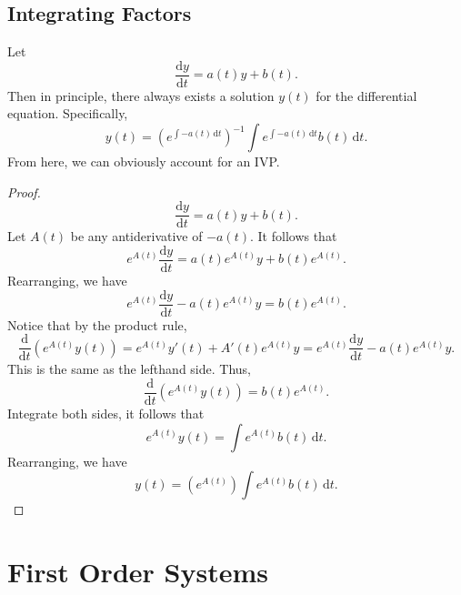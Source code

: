 \section{Integrating Factors}
\begin{theorem}\label{thm:7}
	Let
	\[
		\frac{\mathrm{d}y}{\mathrm{d}t} =a(t)y+b(t)
	.\]
	Then in principle, there always exists a solution $y(t)$ for the differential equation. Specifically,
	\[
		y(t)=\left( e^{\int -a(t) \,\mathrm{d} t} \right) ^{-1}\int e^{\int -a(t) \,\mathrm{d} t}b(t) \,\mathrm{d} t
	.\]
	From here, we can obviously account for an IVP.
\end{theorem}
\begin{proof}
\[
	\frac{\mathrm{d}y}{\mathrm{d}t} =a(t)y+b(t)
.\]
Let $A(t)$ be any antiderivative of $-a(t)$. It follows that
\[
	e^{A(t)}\frac{\mathrm{d}y}{\mathrm{d}t} =a(t)e^{A(t)}y+b(t)e^{A(t)}
.\]
Rearranging, we have
\[
	e^{A(t)}\frac{\mathrm{d}y}{\mathrm{d}t} -a(t)e^{A(t)}y=b(t)e^{A(t)}
.\]
Notice that by the product rule,
\[
	\frac{\mathrm{d}}{\mathrm{d}t} \left( e^{A(t)}y(t) \right) =e^{A(t)}y'(t)+A'(t)e^{A(t)}y=e^{A(t)}\frac{\mathrm{d}y}{\mathrm{d}t} -a(t)e^{A(t)}y
.\]
This is the same as the lefthand side. Thus,
\[
	\frac{\mathrm{d}}{\mathrm{d}t} \left( e^{A(t)}y(t) \right) =b(t)e^{A(t)}
.\]
Integrate both sides, it follows that
\[
	e^{A(t)}y(t)=\int e^{A(t)}b(t) \,\mathrm{d} t
.\]
Rearranging, we have
\[
	y(t)= \left( e^{A(t)} \right) \int e^{A(t)}b(t) \,\mathrm{d} t
.\]
\end{proof}
\chapter{First Order Systems}
